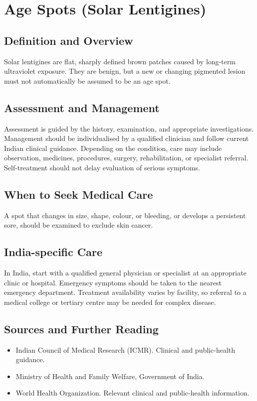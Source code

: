 \chapter{Age Spots (Solar Lentigines)}

\section*{Definition and Overview}
Solar lentigines are flat, sharply defined brown patches caused by long-term ultraviolet exposure. They are benign, but a new or changing pigmented lesion must not automatically be assumed to be an age spot.

\section*{Assessment and Management}
Assessment is guided by the history, examination, and appropriate investigations. Management should be individualised by a qualified clinician and follow current Indian clinical guidance. Depending on the condition, care may include observation, medicines, procedures, surgery, rehabilitation, or specialist referral. Self-treatment should not delay evaluation of serious symptoms.

\section*{When to Seek Medical Care}
A spot that changes in size, shape, colour, or bleeding, or develops a persistent sore, should be examined to exclude skin cancer.

\section*{India-specific Care}
In India, start with a qualified general physician or specialist at an appropriate clinic or hospital. Emergency symptoms should be taken to the nearest emergency department. Treatment availability varies by facility, so referral to a medical college or tertiary centre may be needed for complex disease.

\section*{Sources and Further Reading}
\begin{itemize}
    \item Indian Council of Medical Research (ICMR). Clinical and public-health guidance.
    \item Ministry of Health and Family Welfare, Government of India.
    \item World Health Organization. Relevant clinical and public-health information.
\end{itemize}

